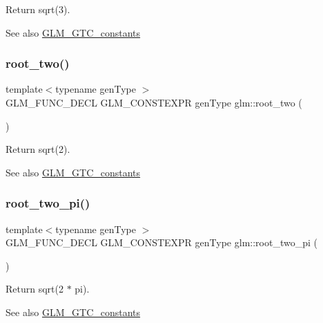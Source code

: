 Return sqrt(3). \begin{DoxySeeAlso}{See also}
\hyperlink{group__gtc__constants}{G\+L\+M\+\_\+\+G\+T\+C\+\_\+constants} 
\end{DoxySeeAlso}
\mbox{\label{group__gtc__constants_ga74e607d29020f100c0d0dc46ce2ca950}} 
\subsubsection{\texorpdfstring{root\+\_\+two()}{root\_two()}}
{\footnotesize\ttfamily template$<$typename gen\+Type $>$ \\
G\+L\+M\+\_\+\+F\+U\+N\+C\+\_\+\+D\+E\+CL G\+L\+M\+\_\+\+C\+O\+N\+S\+T\+E\+X\+PR gen\+Type glm\+::root\+\_\+two (\begin{DoxyParamCaption}{ }\end{DoxyParamCaption})}

Return sqrt(2). \begin{DoxySeeAlso}{See also}
\hyperlink{group__gtc__constants}{G\+L\+M\+\_\+\+G\+T\+C\+\_\+constants} 
\end{DoxySeeAlso}
\mbox{\label{group__gtc__constants_ga2bcedc575039fe0cd765742f8bbb0bd3}} 
\subsubsection{\texorpdfstring{root\+\_\+two\+\_\+pi()}{root\_two\_pi()}}
{\footnotesize\ttfamily template$<$typename gen\+Type $>$ \\
G\+L\+M\+\_\+\+F\+U\+N\+C\+\_\+\+D\+E\+CL G\+L\+M\+\_\+\+C\+O\+N\+S\+T\+E\+X\+PR gen\+Type glm\+::root\+\_\+two\+\_\+pi (\begin{DoxyParamCaption}{ }\end{DoxyParamCaption})}

Return sqrt(2 $\ast$ pi). \begin{DoxySeeAlso}{See also}
\hyperlink{group__gtc__constants}{G\+L\+M\+\_\+\+G\+T\+C\+\_\+constants} 
\end{DoxySeeAlso}
\mbox{\label{group__gtc__constants_ga3077c6311010a214b69ddc8214ec13b5}} 
